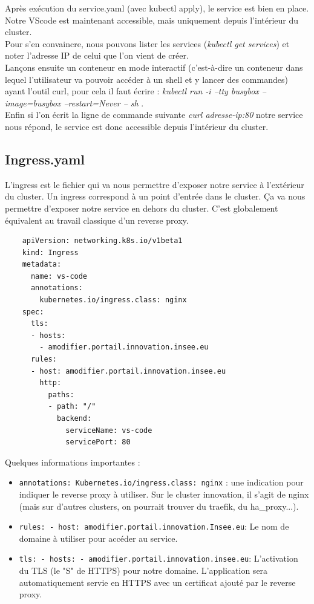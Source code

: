 \documentclass[11pt,fleqn]{book} %
\begin{document}
Après exécution du service.yaml (avec kubectl apply), le service est bien en place. Notre VScode est maintenant accessible, mais uniquement depuis l'intérieur du cluster. \\

Pour s'en convaincre, nous pouvons lister les services (\textit{kubectl get services}) et noter l'adresse IP de celui que l'on vient de créer. \\

Lançons ensuite un conteneur en mode interactif (c'est-à-dire un conteneur dans lequel l'utilisateur va pouvoir accéder à un shell et y lancer des commandes)  ayant l'outil curl, pour cela il faut écrire : \textit{kubectl run -i --tty busybox --image=busybox --restart=Never -- sh }. \\

Enfin si l'on écrit la ligne de commande suivante \textit{curl adresse-ip:80} notre service nous répond, le service est donc accessible depuis l'intérieur du cluster.

\subsection*{Ingress.yaml}
L'ingress est le fichier qui va nous permettre d'exposer notre service à l'extérieur du cluster. Un ingress correspond à un point d'entrée dans le cluster. Ça va nous permettre d'exposer notre service en dehors du cluster. C'est globalement équivalent au travail classique d'un reverse proxy.

\begin{verbatim}
    apiVersion: networking.k8s.io/v1beta1
    kind: Ingress
    metadata:
      name: vs-code
      annotations:
        kubernetes.io/ingress.class: nginx
    spec:
      tls:
      - hosts:
        - amodifier.portail.innovation.insee.eu
      rules:
      - host: amodifier.portail.innovation.insee.eu
        http:
          paths:
          - path: "/"
            backend:
              serviceName: vs-code
              servicePort: 80
\end{verbatim}
Quelques informations importantes :

\begin{itemize}
    \item \texttt{annotations: Kubernetes.io/ingress.class: nginx} : une indication pour indiquer le reverse proxy à utiliser. Sur le cluster innovation, il s'agit de nginx (mais sur d'autres clusters, on pourrait trouver du traefik, du ha\_proxy...).
    \item \texttt{rules: - host: amodifier.portail.innovation.Insee.eu}: Le nom de domaine à utiliser pour accéder au service.
    \item \texttt{tls: - hosts: - amodifier.portail.innovation.insee.eu}: L'activation du TLS (le "S" de HTTPS) pour notre domaine. L'application sera automatiquement servie en HTTPS avec un certificat ajouté par le reverse proxy.\\
\end{itemize}
\end{document}
